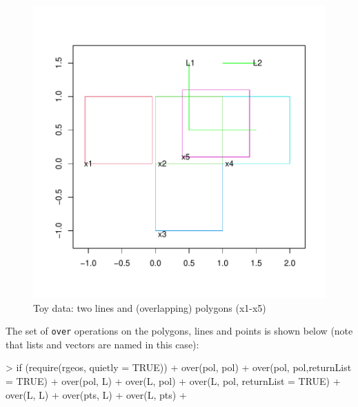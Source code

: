 \documentclass{article}
\newcommand{\code}[1]{{\tt #1}}
\begin{document}
\begin{figure}[htb]
\includegraphics{over-017}
\caption{ Toy data: two lines and (overlapping) polygons (x1-x5) }
\label{fig:lines}
\end{figure}

The set of \code{over} operations on the polygons, lines and points 
is shown below (note that lists and vectors are named in this case):
\begin{Schunk}
\begin{Sinput}
> if (require(rgeos, quietly = TRUE)) {
+ over(pol, pol)
+ over(pol, pol,returnList = TRUE)
+ over(pol, L)
+ over(L, pol)
+ over(L, pol, returnList = TRUE)
+ over(L, L)
+ over(pts, L)
+ over(L, pts)
+ }
\end{Sinput}
\end{Schunk}
\end{document}
